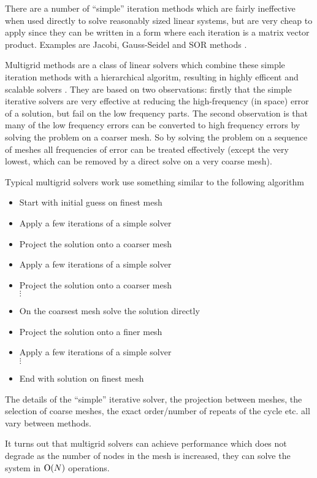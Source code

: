There are a number of ``simple'' iteration methods which are fairly ineffective when used directly to solve reasonably sized linear systems, but are very cheap to apply since they can be written in a form where each iteration is a matrix vector product.
Examples are Jacobi, Gauss-Seidel and SOR methods \cite[103]{Saad2000}.

Multigrid methods are a class of linear solvers which combine these simple iteration methods with a hierarchical algoritm, resulting in highly efficent and scalable solvers \cite{multigrid-tut}.
They are based on two observations: firstly that the simple iterative solvers are very effective at reducing the high-frequency (in space) error of a solution, but fail on the low frequency parts.
The second observation is that many of the low frequency errors can be converted to high frequency errors by solving the problem on a coarser mesh.
So by solving the problem on a sequence of meshes all frequencies of error can be treated effectively (except the very lowest, which can be removed by a direct solve on a very coarse mesh).

Typical multigrid solvers work use something similar to the following algorithm
\begin{itemize}
\item Start with initial guess on finest mesh
\item Apply a few iterations of a simple solver
\item Project the solution onto a coarser mesh
\item Apply a few iterations of a simple solver
\item Project the solution onto a coarser mesh \\
  $\vdots$
\item On the coarsest mesh solve the solution directly
\item Project the solution onto a finer mesh
\item Apply a few iterations of a simple solver \\
  $\vdots$
\item End with solution on finest mesh
\end{itemize}
The details of the ``simple'' iterative solver, the projection between meshes, the selection of coarse meshes, the exact order/number of repeats of the cycle etc. all vary between methods.

It turns out that multigrid solvers can achieve performance which does not degrade as the number of nodes in the mesh is increased, \ie they can solve the system in $\text{O}{\left( N \right)}$ operations.


